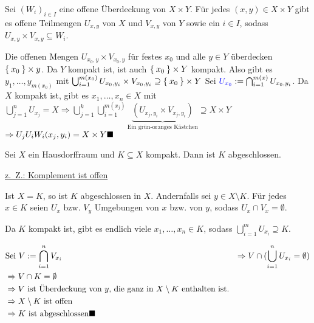 \begin{beweis}
    Sei $(W_i)_{i \in I}$ eine offene Überdeckung von $X \times Y$.
    Für jedes $(x,y) \in X \times Y$ gibt es offene Teilmengen
    $U_{x,y}$ von $X$ und $V_{x,y}$ von $Y$ sowie ein $i \in I$, sodass
    $U_{x,y} \times V_{x,y} \subseteq W_i$.

    \begin{figure}[htp]
        \centering
        
        \caption{}
    \end{figure}

    Die offenen Mengen $U_{x_0, y} \times V_{x_0, y}$ für festes $x_0$
    und alle $y \in Y$ überdecken $\Set{x_0} \times y$. Da $Y$ kompakt
    ist, ist auch $\Set{x_0} \times Y$ kompakt. Also gibt es 
    $y_1, \dots, y_{m(x_0)}$ mit 
    $\bigcup_{i=1}^{m(x_0)} U_{x_0, y_i} \times V_{x_0, y_i} \supseteq \Set{x_0} \times Y$
    Sei ${\color{blue} U_{x_0}} := \bigcap_{i=1}^{m(x)} U_{x_0, y_i}$.
    Da $X$ kompakt ist, gibt es $x_1, \dots, x_n \in X$ mit 
    $\bigcup_{j=1}^n U_{x_j} = X \Rightarrow \bigcup_{j=1}^k \bigcup_{i=1}^{m(x_j)} \underbrace{\left ( U_{x_j, y_i} \times V_{x_j, y_i} \right)}_{\text{Ein grün-oranges Kästchen}} \supseteq X \times Y$\\
    $\Rightarrow U_j U_i W_i (x_j, y_i) = X \times Y \qed$
\end{beweis}

\begin{korollar}\label{hausdorffraumKompakteTeilmengeAbgeschlossen}
    Sei $X$ ein Hausdorffraum und $K \subseteq X$ kompakt.
    Dann ist $K$ abgeschlossen.
\end{korollar}

\begin{beweis}
    \underline{z.~Z.: Komplement ist offen}

    Ist $X = K$, so ist $K$ abgeschlossen in $X$. Andernfalls sei 
    $y \in X \setminus K$. Für jedes $x \in K$ seien $U_x$ bzw. $V_y$
    Umgebungen von $x$ bzw. von $y$, sodass $U_x \cap V_x = \emptyset$.

    \begin{figure}[htp]
        \centering
        
    \end{figure}

    Da $K$ kompakt ist, gibt es endlich viele $x_1, \dots, x_n \in K$,
    sodass $\bigcup_{i=1}^m U_{x_i} \supseteq K$.

    \begin{align*}
        &\text{Sei } V := \bigcap_{i=1}^n V_{x_i}
        &\Rightarrow V \cap (\bigcup_{i=1}^n U_{x_i} = \emptyset)\\
        &\Rightarrow V \cap K = \emptyset\\
        &\Rightarrow V \text{ ist Überdeckung von } y\text{, die ganz in } X \setminus K \text{ enthalten ist}.\\
        &\Rightarrow X \setminus K \text{ ist offen}\\
        &\Rightarrow K \text{ ist abgeschlossen} \qed
    \end{align*}
\end{beweis}

